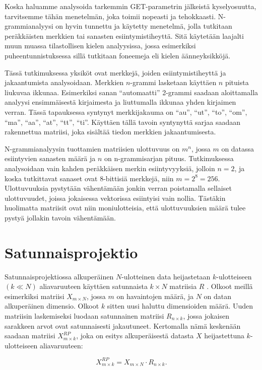 Koska haluamme analysoida tarkemmin GET-parametrin jälkeistä kyselyosuutta, tarvitsemme tähän menetelmän, joka toimii nopeasti ja tehokkaasti. N-\-grammianalyysi on hyvin tunnettu ja käytetty menetelmä, jolla tutkitaan 
peräkkäisten merkkien tai sanasten esiintymistiheyttä. Sitä käytetään laajalti muun muassa tilastollisen kielen analyysissa, jossa esimerkiksi puheentunnistuksessa sillä tutkitaan foneemeja eli kielen äänneyksikköjä. 

Tässä tutkimuksessa yksiköt ovat merkkejä, joiden esiintymistiheyttä ja jakaantumista analysoidaan. Merkkien $n$-grammi lasketaan käyttäen $n$ pituista liukuvaa ikkunaa. Esimerkiksi sanan ``automaatti'' 2-grammi 
saadaan aloittamalla analyysi ensimmäisestä kirjaimesta ja liuttumalla ikkunaa yhden kirjaimen verran. Tässä tapauksessa syntynyt merkkijakauma on ``au'', ``ut'', ``to'', ``om'', ``ma'', ``aa'', ``at'', ``tt'', ``ti''. 
Käyttäen tällä tavoin syntynyttä sarjaa saadaan rakennettua matriisi, joka sisältää tiedon merkkien jakaantumisesta.

N-grammianalyysin tuottamien matriisien ulottuvuus on $m^n$, jossa $m$ on datassa esiintyvien sanasten määrä ja $n$ on n-grammisarjan pituus. Tutkimuksessa analysoidaan vain kahden peräkkäisen merkin esiintyvyyksiä, 
jolloin $n=2$, ja koska tutkittavat sanaset ovat 8-bittisiä merkkejä, niin $m=2^8=256$. Ulottuvuuksia pystytään vähentämään jonkin verran poistamalla sellaiset ulottuvuudet, joissa jokaisessa vektorissa esiintyisi vain 
nollia. Tästäkin huolimatta matriisit ovat niin moniulotteisia, että ulottuvuuksien määrä tulee pystyä jollakin tavoin vähentämään. 

\section{Satunnaisprojektio}

Satunnaisprojektiossa alkuperäinen $N$-ulotteinen data heijastetaan $k$-ulotteiseen $(k \ll N)$ aliavaruuteen käyttäen satunnaista $k \times N$ matriisia $R$ \cite{Random}. Olkoot meillä esimerkiksi matriisi 
$X_{m\times N}$, jossa $m$ on havaintojen määrä, ja $N$ on datan alkuperäinen dimensio. Olkoot  $k$  sitten uusi haluttu dimensioiden määrä. Uuden matriisin laskemiseksi luodaan satunnainen matriisi 
$R_{n \times k}$, jossa jokaisen sarakkeen arvot ovat satunnaisesti jakautuneet. Kertomalla nämä keskenään saadaan matriisi $X_{m \times k}^{RP}$, joka on esitys alkuperäisestä datasta $X$ heijastettuna $k$-ulotteiseen 
aliavaruuteen:

\begin{equation}
X_{m \times k}^{RP} = X_{m \times N} \cdot R_{n \times k}.
\label{RP}
\end{equation}


